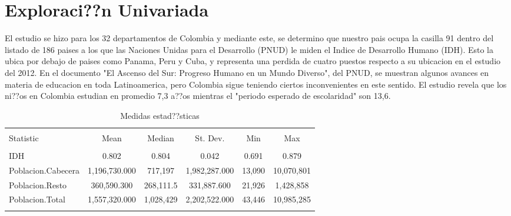 \section{Exploraci??n Univariada}\label{univariada}




El estudio se hizo para los 32 departamentos de Colombia y mediante este, se determino que nuestro pais ocupa la casilla 91 dentro del listado de 186 paises a los que las Naciones Unidas para el Desarrollo (PNUD) le miden el Indice de Desarrollo Humano (IDH). 
Esto la ubica por debajo de paises como Panama, Peru y Cuba, y representa una perdida de cuatro puestos respecto a su ubicacion en el estudio del 2012.  
En el documento "El Ascenso del Sur: Progreso Humano en un Mundo Diverso", del PNUD, se muestran algunos avances en materia de educacion en toda Latinoamerica, pero Colombia sigue teniendo ciertos inconvenientes en este sentido.  
El estudio revela que los ni??os en Colombia estudian en promedio 7,3 a??os mientras el "periodo esperado de escolaridad" son 13,6. 

\begin{table}[!htbp] \centering 
  \caption{Medidas estad??sticas} 
  \label{stats} 
\begin{tabular}{@{\extracolsep{5pt}}lccccc} 
\\[-1.8ex]\hline 
\hline \\[-1.8ex] 
Statistic & \multicolumn{1}{c}{Mean} & \multicolumn{1}{c}{Median} & \multicolumn{1}{c}{St. Dev.} & \multicolumn{1}{c}{Min} & \multicolumn{1}{c}{Max} \\ 
\hline \\[-1.8ex] 
IDH & 0.802 & 0.804 & 0.042 & 0.691 & 0.879 \\ 
Poblacion.Cabecera & 1,196,730.000 & 717,197 & 1,982,287.000 & 13,090 & 10,070,801 \\ 
Poblacion.Resto & 360,590.300 & 268,111.5 & 331,887.600 & 21,926 & 1,428,858 \\ 
Poblacion.Total & 1,557,320.000 & 1,028,429 & 2,202,522.000 & 43,446 & 10,985,285 \\ 
\hline \\[-1.8ex] 
\end{tabular} 
\end{table} \centering


